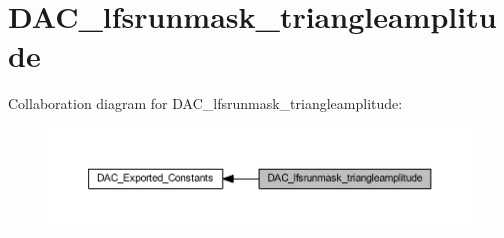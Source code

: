 \hypertarget{group___d_a_c__lfsrunmask__triangleamplitude}{}\section{D\+A\+C\+\_\+lfsrunmask\+\_\+triangleamplitude}
\label{group___d_a_c__lfsrunmask__triangleamplitude}
Collaboration diagram for D\+A\+C\+\_\+lfsrunmask\+\_\+triangleamplitude\+:
\nopagebreak
\begin{figure}[H]
\begin{center}
\leavevmode
\includegraphics[width=350pt]{group___d_a_c__lfsrunmask__triangleamplitude}
\end{center}
\end{figure}
